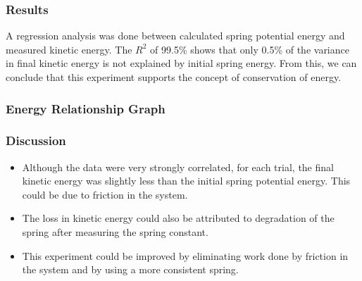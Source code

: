 \documentclass{beamer}
\begin{document}
\begin{frame} 
    \frametitle{Results} 
    A regression analysis was done between calculated spring potential energy
    and measured kinetic energy. The $R^2$ of 99.5\% shows that only 0.5\% of
    the variance in final kinetic energy is not explained by initial spring
    energy. From this, we can conclude that this experiment supports the
    concept of conservation of energy.
\end{frame}

\begin{frame}
    \frametitle{Energy Relationship Graph}
\end{frame}

\begin{frame}
    \frametitle{Discussion}
    \begin{itemize}
        \item Although the data were very strongly correlated, for each trial,
            the final kinetic energy was slightly less than the initial spring
            potential energy. This could be due to friction in the system.
        \item The loss in kinetic energy could also be attributed to
            degradation of the spring after measuring the spring constant.
        \item This experiment could be improved by eliminating work done by
            friction in the system and by using a more consistent spring.
    \end{itemize}
\end{frame}
\end{document}
